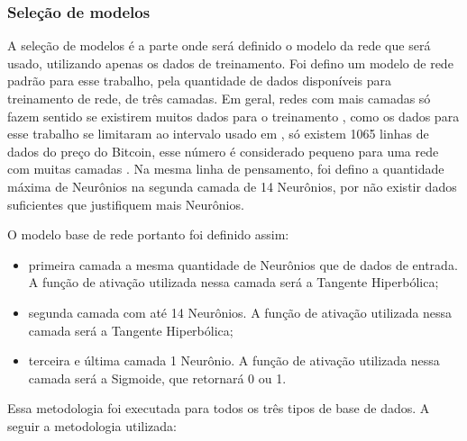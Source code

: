 \subsubsection{Seleção de modelos}

 A seleção de modelos é a parte onde será definido o modelo da rede que será usado, utilizando apenas os dados de treinamento. Foi defino um modelo de rede padrão para esse trabalho, pela quantidade de dados disponíveis para treinamento de rede, de três camadas. Em geral, redes com mais camadas só fazem sentido se existirem muitos dados para o treinamento , como os dados para esse trabalho se limitaram ao intervalo usado em \cite{mcnally2016predicting}, só existem 1065 linhas de dados do preço do Bitcoin, esse número é considerado pequeno para uma rede com muitas camadas . Na mesma linha de pensamento, foi defino a quantidade máxima de Neurônios na segunda camada de 14 Neurônios, por não existir dados suficientes que justifiquem mais Neurônios.
 
 O modelo base de rede portanto foi definido assim:
 
 \begin{itemize}
     \item primeira camada a mesma quantidade de Neurônios que de dados de entrada. A função de ativação utilizada nessa camada será a Tangente Hiperbólica;
     \item segunda camada com até 14 Neurônios. A função de ativação utilizada nessa camada será a Tangente Hiperbólica;
     \item terceira e última camada 1 Neurônio. A função de ativação utilizada nessa camada será a Sigmoide, que retornará 0 ou 1.
 \end{itemize}
 

Essa metodologia foi executada para todos os três tipos de base de dados. A seguir a metodologia utilizada:
 
